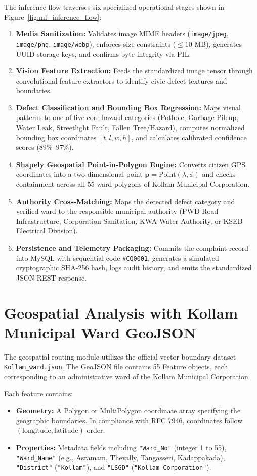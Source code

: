 \documentclass[12pt,a4paper]{report}
\begin{document}
The inference flow traverses six specialized operational stages shown in Figure~\ref{fig:ml_inference_flow}:
\begin{enumerate}
    \item \textbf{Media Sanitization:} Validates image MIME headers (\texttt{image/jpeg}, \texttt{image/png}, \texttt{image/webp}), enforces size constraints ($\le 10$ MB), generates UUID storage keys, and confirms byte integrity via PIL.
    \item \textbf{Vision Feature Extraction:} Feeds the standardized image tensor through convolutional feature extractors to identify civic defect textures and boundaries.
    \item \textbf{Defect Classification and Bounding Box Regression:} Maps visual patterns to one of five core hazard categories (Pothole, Garbage Pileup, Water Leak, Streetlight Fault, Fallen Tree/Hazard), computes normalized bounding box coordinates $[t, l, w, h]$, and calculates calibrated confidence scores ($89\%$--$97\%$).
    \item \textbf{Shapely Geospatial Point-in-Polygon Engine:} Converts citizen GPS coordinates into a two-dimensional point $\mathbf{p} = \mathrm{Point}(\lambda, \phi)$ and checks containment across all 55 ward polygons of Kollam Municipal Corporation.
    \item \textbf{Authority Cross-Matching:} Maps the detected defect category and verified ward to the responsible municipal authority (PWD Road Infrastructure, Corporation Sanitation, KWA Water Authority, or KSEB Electrical Division).
    \item \textbf{Persistence and Telemetry Packaging:} Commits the complaint record into MySQL with sequential code \texttt{\#CQ0001}, generates a simulated cryptographic SHA-256 hash, logs audit history, and emits the standardized JSON REST response.
\end{enumerate}

\section{Geospatial Analysis with Kollam Municipal Ward GeoJSON}
The geospatial routing module utilizes the official vector boundary dataset \texttt{Kollam\_ward.json}. The GeoJSON file contains 55 Feature objects, each corresponding to an administrative ward of the Kollam Municipal Corporation.

Each feature contains:
\begin{itemize}
    \item \textbf{Geometry:} A Polygon or MultiPolygon coordinate array specifying the geographic boundaries. In compliance with RFC 7946, coordinates follow $(\text{longitude}, \text{latitude})$ order.
    \item \textbf{Properties:} Metadata fields including \texttt{"Ward\_No"} (integer 1 to 55), \texttt{"Ward\_Name"} (e.g., Asramam, Thevally, Tangasseri, Kadappakada), \texttt{"District"} (\texttt{"Kollam"}), and \texttt{"LSGD"} (\texttt{"Kollam Corporation"}).
\end{itemize}
\end{document}
